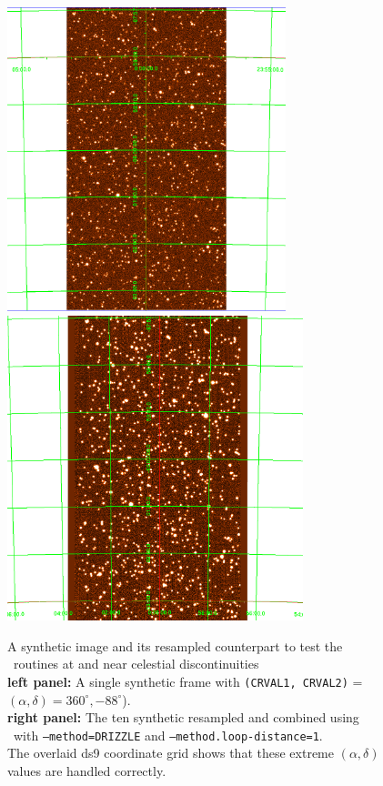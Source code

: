 \begin{figure}[H]
\centering
\includegraphics[width=8.1cm]{figures/synth_disc2_stars_gal_bkgd_1.png}
\includegraphics[width=8.6cm]{figures/hdrldemo_resample_DRIZZLE_disc2_coadd_1.png} 
\caption[]
	{\footnotesize  A synthetic image and its resampled counterpart to test the \hdrlresample\ routines at and near celestial discontinuities  \\
	{\bf left panel:}    A single synthetic frame with {\tt (CRVAL1, CRVAL2)} =  $(\alpha, \delta) = 360^\circ, -88^\circ$).      \\
	{\bf right panel:}  The ten synthetic resampled and combined using \hdrlresample\ with {\tt --method=DRIZZLE} and {\tt --method.loop-distance=1}.\\
	The overlaid ds9 coordinate grid shows that these extreme $(\alpha, \delta)$ values are handled correctly.
	}
	\label{fig:discontinuity}
\end{figure}



